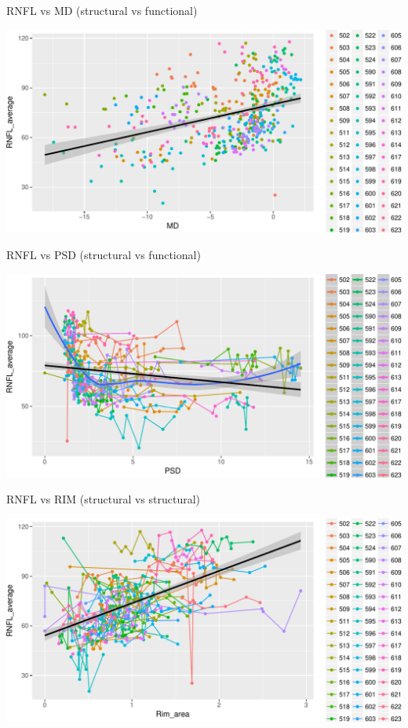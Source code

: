\documentclass[ignorenonframetext,]{beamer}
\begin{document}
\begin{frame}{RNFL vs MD (structural vs functional)}

\includegraphics{analisi_exp_markdown_files/figure-beamer/unnamed-chunk-16-1.pdf}

\end{frame}

\begin{frame}{RNFL vs PSD (structural vs functional)}

\includegraphics{analisi_exp_markdown_files/figure-beamer/unnamed-chunk-17-1.pdf}

\end{frame}

\begin{frame}{RNFL vs RIM (structural vs structural)}

\includegraphics{analisi_exp_markdown_files/figure-beamer/unnamed-chunk-18-1.pdf}

\end{frame}
\end{document}
